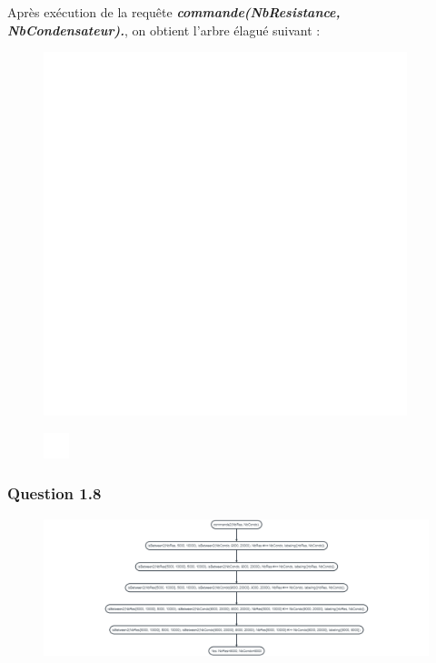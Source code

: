 \documentclass[
]{article}
\begin{document}
Après exécution de la requête \textbf{\emph{commande(NbResistance,
NbCondensateur).}}, on obtient l'arbre élagué suivant :

\begin{figure}
\hypertarget{mermaid}{%
\centering
\includegraphics[width=4.16667in,height=\textheight]{1611931517726.png}
\caption{}\label{mermaid}
}
\end{figure}

\begin{figure}
\hypertarget{mermaid}{%
\centering
\includegraphics[width=0.29167in,height=\textheight]{1611931517726.png}
\caption{}\label{mermaid}
}
\end{figure}

\hypertarget{header-n66}{%
\subsubsection{Question 1.8}\label{header-n66}}

\begin{figure}
\hypertarget{flow}{%
\centering
\includegraphics[width=8.20833in,height=\textheight]{1611931517727.png}
\caption{}\label{flow}
}
\end{figure}
\end{document}
